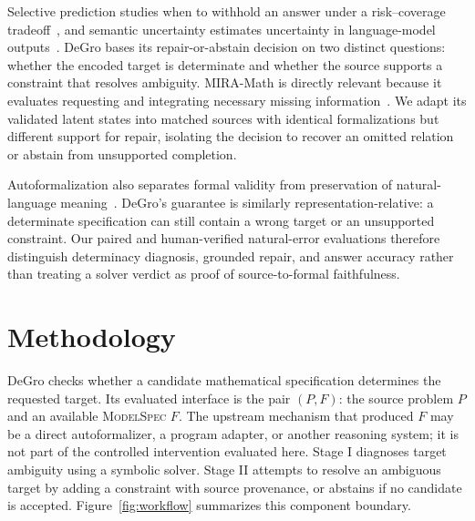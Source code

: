 \documentclass[sigconf,anonymous]{aamas}
\begin{document}
Selective prediction studies when to withhold an answer under a risk--coverage tradeoff~\cite{elyaniv2010foundations,geifman2017selective}, and semantic uncertainty estimates uncertainty in language-model outputs~\cite{kuhn2023semantic}.  DeGro bases its repair-or-abstain decision on two distinct questions: whether the encoded target is determinate and whether the source supports a constraint that resolves ambiguity.  MIRA-Math is directly relevant because it evaluates requesting and integrating necessary missing information~\cite{albateh2026mira}.  We adapt its validated latent states into matched sources with identical formalizations but different support for repair, isolating the decision to recover an omitted relation or abstain from unsupported completion.

Autoformalization also separates formal validity from preservation of natural-language meaning~\cite{wu2022autoformalization,azerbayev2023proofnet}.  DeGro's guarantee is similarly representation-relative: a determinate specification can still contain a wrong target or an unsupported constraint.  Our paired and human-verified natural-error evaluations therefore distinguish determinacy diagnosis, grounded repair, and answer accuracy rather than treating a solver verdict as proof of source-to-formal faithfulness.

\section{Methodology}
DeGro checks whether a candidate mathematical specification determines the requested target.  Its evaluated interface is the pair $(P,F)$: the source problem $P$ and an available \textsc{ModelSpec} $F$.  The upstream mechanism that produced $F$ may be a direct autoformalizer, a program adapter, or another reasoning system; it is not part of the controlled intervention evaluated here.  Stage I diagnoses target ambiguity using a symbolic solver. Stage II attempts to resolve an ambiguous target by adding a constraint with source provenance, or abstains if no candidate is accepted. Figure~\ref{fig:workflow} summarizes this component boundary.
\end{document}
